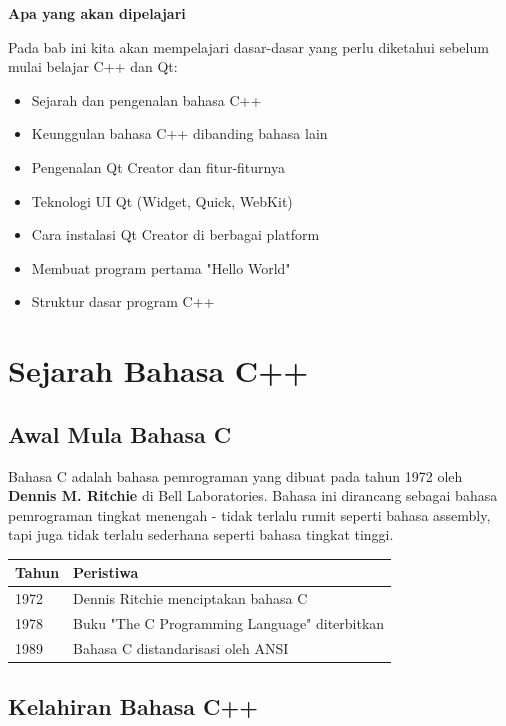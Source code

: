 \textbf{Apa yang akan dipelajari}

Pada bab ini kita akan mempelajari dasar-dasar yang perlu diketahui sebelum mulai belajar C++ dan Qt:

\begin{itemize}
\item Sejarah dan pengenalan bahasa C++
\item Keunggulan bahasa C++ dibanding bahasa lain
\item Pengenalan Qt Creator dan fitur-fiturnya
\item Teknologi UI Qt (Widget, Quick, WebKit)
\item Cara instalasi Qt Creator di berbagai platform
\item Membuat program pertama "Hello World"
\item Struktur dasar program C++
\end{itemize}

\minitoc

\section{Sejarah Bahasa C++}

\subsection{Awal Mula Bahasa C}

Bahasa C adalah bahasa pemrograman yang dibuat pada tahun 1972 oleh \textbf{Dennis M. Ritchie} di Bell Laboratories. Bahasa ini dirancang sebagai bahasa pemrograman tingkat menengah - tidak terlalu rumit seperti bahasa assembly, tapi juga tidak terlalu sederhana seperti bahasa tingkat tinggi.

\begin{center}
\begin{tabular}{|l|l|}
\hline
\textbf{Tahun} & \textbf{Peristiwa} \\
\hline
1972 & Dennis Ritchie menciptakan bahasa C \\
\hline
1978 & Buku "The C Programming Language" diterbitkan \\
\hline
1989 & Bahasa C distandarisasi oleh ANSI \\
\hline
\end{tabular}
\end{center}

\subsection{Kelahiran Bahasa C++}


